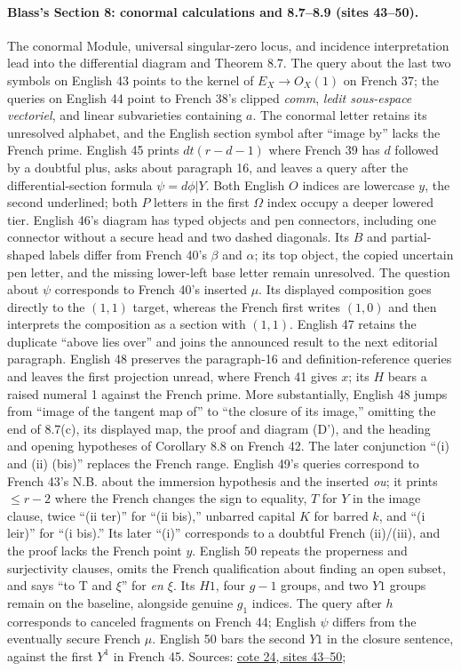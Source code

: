 \documentclass[10pt,a4paper]{article}
\begin{document}
\paragraph{Blass's Section 8: conormal calculations and 8.7--8.9 (sites 43--50).}
The conormal Module, universal singular-zero locus, and incidence interpretation lead into the differential diagram and Theorem 8.7. The query about the last two symbols on English 43 points to the kernel of $E_X\to O_X(1)$ on French 37; the queries on English 44 point to French 38's clipped \emph{comm}, \emph{ledit sous-espace vectoriel}, and linear subvarieties containing $a$. The conormal letter retains its unresolved alphabet, and the English section symbol after ``image by'' lacks the French prime. English 45 prints $dt(r-d-1)$ where French 39 has $d$ followed by a doubtful plus, asks about paragraph 16, and leaves a query after the differential-section formula $\psi=d\phi|Y$. Both English $O$ indices are lowercase $y$, the second underlined; both $P$ letters in the first $\Omega$ index occupy a deeper lowered tier. English 46's diagram has typed objects and pen connectors, including one connector without a secure head and two dashed diagonals. Its $B$ and partial-shaped labels differ from French 40's $\beta$ and $\alpha$; its top object, the copied uncertain pen letter, and the missing lower-left base letter remain unresolved. The question about $\psi$ corresponds to French 40's inserted $\mu$. Its displayed composition goes directly to the $(1,1)$ target, whereas the French first writes $(1,0)$ and then interprets the composition as a section with $(1,1)$. English 47 retains the duplicate ``above lies over'' and joins the announced result to the next editorial paragraph. English 48 preserves the paragraph-16 and definition-reference queries and leaves the first projection unread, where French 41 gives $x$; its $H$ bears a raised numeral 1 against the French prime. More substantially, English 48 jumps from ``image of the tangent map of'' to ``the closure of its image,'' omitting the end of 8.7(c), its displayed map, the proof and diagram (D'), and the heading and opening hypotheses of Corollary 8.8 on French 42. The later conjunction ``(i) and (ii) (bis)'' replaces the French range. English 49's queries correspond to French 43's N.B. about the immersion hypothesis and the inserted \emph{ou}; it prints $\leq r-2$ where the French changes the sign to equality, $T$ for $Y$ in the image clause, twice ``(ii ter)'' for ``(ii bis),'' unbarred capital $K$ for barred $k$, and ``(i leir)'' for ``(i bis).'' Its later ``(i)'' corresponds to a doubtful French (ii)/(iii), and the proof lacks the French point $y$. English 50 repeats the properness and surjectivity clauses, omits the French qualification about finding an open subset, and says ``to T and $\xi$'' for \emph{en $\xi$}. Its $H1$, four $g-1$ groups, and two $Y1$ groups remain on the baseline, alongside genuine $g_1$ indices. The query after $h$ corresponds to canceled fragments on French 44; English $\psi$ differs from the eventually secure French $\mu$. English 50 bars the second $Y1$ in the closure sentence, against the first $Y^1$ in French 45. Sources: \href{https://grothendieck.umontpellier.fr/web/viewer.html?file=../24.pdf\#page=44}{cote 24, sites 43--50}; 
\end{document}
